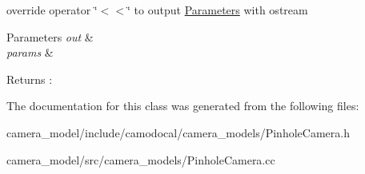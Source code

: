 override operator \char`\"{}$<$$<$\char`\"{} to output \hyperlink{classcamodocal_1_1PinholeCamera_1_1Parameters}{Parameters} with ostream 


\begin{DoxyParams}{Parameters}
{\em out} & \\
\hline
{\em params} & \\
\hline
\end{DoxyParams}
\begin{DoxyReturn}{Returns}
\+: 
\end{DoxyReturn}


The documentation for this class was generated from the following files\+:\begin{DoxyCompactItemize}
\item 
camera\+\_\+model/include/camodocal/camera\+\_\+models/Pinhole\+Camera.\+h\item 
camera\+\_\+model/src/camera\+\_\+models/Pinhole\+Camera.\+cc\end{DoxyCompactItemize}
